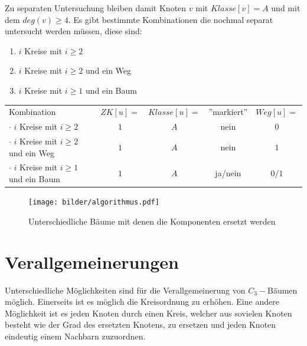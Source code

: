 Zu separaten Untersuchung bleiben damit Knoten $v$ mit $Klasse[v]=A$ und mit dem $deg(v)\geq 4$. Es gibt bestimmte Kombinationen die nochmal separat untersucht werden müssen, diese sind:
\begin{enumerate}
\item $i$ Kreise mit $i\geq 2$
\item $i$ Kreise mit $i\geq 2$ und ein Weg
\item $i$ Kreise mit $i\geq 1$ und ein Baum
\end{enumerate}
\begin{tabular}{lcccc}
Kombination & $ZK[u]=$ & $Klasse[u]=$ & ''markiert''& $Weg[u]=$ \\
$\cdot$ $i$ Kreise mit $i\geq 2$& $1$& $A$ & nein& $0$\\
$\cdot$ $i$ Kreise mit $i\geq 2$ und ein Weg &$1$& $A$& nein &$1$\\
$\cdot$ $i$ Kreise mit $i\geq 1$ und ein Baum & $1$& $A$& ja/nein &$0/1$\\
\end{tabular}
\begin{figure}[h!]
		\centering 		 
   \texttt{[image: bilder/algorithmus.pdf]}
	\caption{Unterschiedliche Bäume mit denen die Komponenten ersetzt werden}
  	 \end{figure}
\newpage

\section{Verallgemeinerungen}
Unterschiedliche Möglichkeiten sind für die Verallgemeinerung von $C_3-$Bäumen möglich. Einerseits ist es möglich die Kreisordnung zu erhöhen. Eine andere Möglichkeit ist es jeden Knoten durch einen Kreis, welcher aus sovielen Knoten besteht wie der Grad des ersetzten Knotens, zu ersetzen und jeden Knoten eindeutig einem Nachbarn zuzuordnen.


